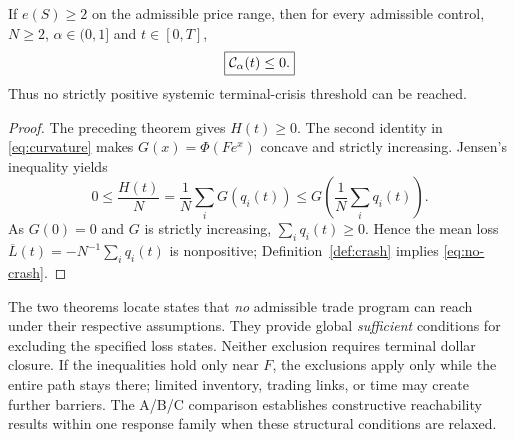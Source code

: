 \documentclass[review,hidelinks,onefignum,onetabnum]{siamonline250211}
\begin{document}
\begin{theorem}\label{thm:barrier2}
If $e(S)\ge2$ on the admissible price range, then for every admissible control, $N\ge2$, $\alpha\in(0,1]$ and $t\in[0,T]$,
\begin{equation}\label{eq:no-crash}
\boxed{\mathcal{C}_\alpha(t)\le0.}
\end{equation}
Thus no strictly positive systemic terminal-crisis threshold can be reached.
\end{theorem}
\begin{proof}
The preceding theorem gives $H(t)\ge0$. The second identity in \eqref{eq:curvature} makes $G(x)=\Phi(Fe^x)$ concave and strictly increasing. Jensen's inequality yields
\[
0\le\frac{H(t)}N=\frac1N\sum_iG(q_i(t))
\le G\!\left(\frac1N\sum_iq_i(t)\right).
\]
As $G(0)=0$ and $G$ is strictly increasing, $\sum_iq_i(t)\ge0$. Hence the mean loss $\overline L(t)=-N^{-1}\sum_iq_i(t)$ is nonpositive; Definition~\ref{def:crash} implies \eqref{eq:no-crash}.
\end{proof}

The two theorems locate states that \emph{no} admissible trade program can reach under their respective assumptions. They provide global \emph{sufficient} conditions for excluding the specified loss states. Neither exclusion requires terminal dollar closure. If the inequalities hold only near $F$, the exclusions apply only while the entire path stays there; limited inventory, trading links, or time may create further barriers. The A/B/C comparison establishes constructive reachability results within one response family when these structural conditions are relaxed.
\end{document}
